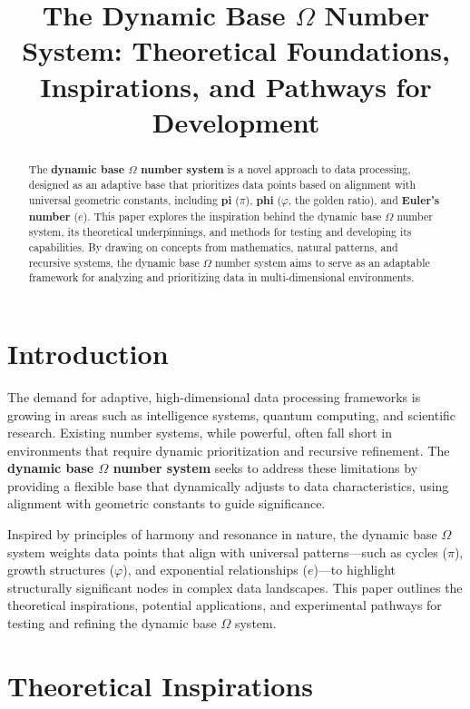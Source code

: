 \documentclass{article}
\title{The Dynamic Base $\Omega$ Number System: Theoretical Foundations, Inspirations, and Pathways for Development}
\author{}
\date{}
\begin{document}
\maketitle

\begin{abstract}
The \textbf{dynamic base $\Omega$ number system} is a novel approach to data processing, designed as an adaptive base that prioritizes data points based on alignment with universal geometric constants, including \textbf{pi} ($\pi$), \textbf{phi} ($\varphi$, the golden ratio), and \textbf{Euler’s number} ($e$). This paper explores the inspiration behind the dynamic base $\Omega$ number system, its theoretical underpinnings, and methods for testing and developing its capabilities. By drawing on concepts from mathematics, natural patterns, and recursive systems, the dynamic base $\Omega$ number system aims to serve as an adaptable framework for analyzing and prioritizing data in multi-dimensional environments.
\end{abstract}

\section{Introduction}

The demand for adaptive, high-dimensional data processing frameworks is growing in areas such as intelligence systems, quantum computing, and scientific research. Existing number systems, while powerful, often fall short in environments that require dynamic prioritization and recursive refinement. The \textbf{dynamic base $\Omega$ number system} seeks to address these limitations by providing a flexible base that dynamically adjusts to data characteristics, using alignment with geometric constants to guide significance.

Inspired by principles of harmony and resonance in nature, the dynamic base $\Omega$ system weights data points that align with universal patterns—such as cycles ($\pi$), growth structures ($\varphi$), and exponential relationships ($e$)—to highlight structurally significant nodes in complex data landscapes. This paper outlines the theoretical inspirations, potential applications, and experimental pathways for testing and refining the dynamic base $\Omega$ system.

\section{Theoretical Inspirations}
\end{document}
